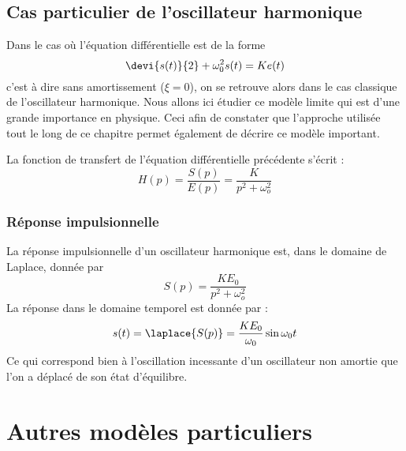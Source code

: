 \subsection{Cas particulier de l'oscillateur harmonique}

Dans le cas où l'équation différentielle est de la forme 
$$
\devi{s(t)}{2}+\omega_0^2 s(t)=Ke(t)
$$
c'est à dire sans amortissement ($\xi=0$), on se retrouve alors dans le 
cas classique de l'oscillateur harmonique.
Nous allons ici étudier ce modèle limite qui est d'une grande importance 
en physique. Ceci afin de constater que l'approche utilisée tout le long de 
ce chapitre permet également de décrire ce modèle important. 

La fonction de transfert de l'équation différentielle précédente s'écrit :
$$
H(p)=\dfrac{S(p)}{E(p)}=\dfrac{K}{p^2+\omega_o^2}
$$

\subsubsection{Réponse impulsionnelle}
La réponse impulsionnelle d'un oscillateur harmonique est, dans le domaine 
de Laplace, donnée par 
$$
S(p)=\dfrac{KE_0}{p^2+\omega_o^2}
$$
La réponse dans le domaine temporel est donnée par :
$$
s(t)=\laplace{S(p)}=\dfrac{KE_0}{\omega_0}\sin{\omega_0t}
$$
Ce qui correspond bien à l'oscillation incessante d'un oscillateur non amortie
que l'on a déplacé de son état d'équilibre.

\newpage
\section{Autres modèles particuliers}

